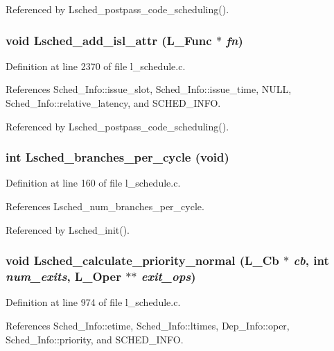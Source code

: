 Referenced by Lsched\_\-postpass\_\-code\_\-scheduling().
\subsubsection{\setlength{\rightskip}{0pt plus 5cm}void Lsched\_\-add\_\-isl\_\-attr (L\_\-Func $\ast$ {\em fn})}\label{l__schedule_8c_1882c164271a9d0021a970f2735de0b0}




Definition at line 2370 of file l\_\-schedule.c.

References Sched\_\-Info::issue\_\-slot, Sched\_\-Info::issue\_\-time, NULL, Sched\_\-Info::relative\_\-latency, and SCHED\_\-INFO.

Referenced by Lsched\_\-postpass\_\-code\_\-scheduling().
\subsubsection{\setlength{\rightskip}{0pt plus 5cm}int Lsched\_\-branches\_\-per\_\-cycle (void)}\label{l__schedule_8c_88f473ee64c9d02c72fbce4fbed050b1}




Definition at line 160 of file l\_\-schedule.c.

References Lsched\_\-num\_\-branches\_\-per\_\-cycle.

Referenced by Lsched\_\-init().
\subsubsection{\setlength{\rightskip}{0pt plus 5cm}void Lsched\_\-calculate\_\-priority\_\-normal (L\_\-Cb $\ast$ {\em cb}, int {\em num\_\-exits}, L\_\-Oper $\ast$$\ast$ {\em exit\_\-ops})}\label{l__schedule_8c_4e16f3a046599410c9dea41ee3313473}




Definition at line 974 of file l\_\-schedule.c.

References Sched\_\-Info::etime, Sched\_\-Info::ltimes, Dep\_\-Info::oper, Sched\_\-Info::priority, and SCHED\_\-INFO.

